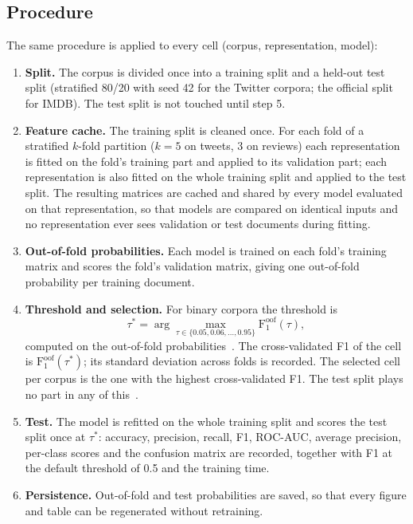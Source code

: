 \subsection{Procedure}
The same procedure is applied to every cell (corpus, representation, model):
\begin{enumerate}
\item \textbf{Split.} The corpus is divided once into a training split and a held-out test split (stratified 80/20 with seed 42 for the Twitter corpora; the official split for IMDB). The test split is not touched until step 5.
\item \textbf{Feature cache.} The training split is cleaned once. For each fold of a stratified $k$-fold partition ($k = 5$ on tweets, 3 on reviews) each representation is fitted on the fold's training part and applied to its validation part; each representation is also fitted on the whole training split and applied to the test split. The resulting matrices are cached and shared by every model evaluated on that representation, so that models are compared on identical inputs and no representation ever sees validation or test documents during fitting.
\item \textbf{Out-of-fold probabilities.} Each model is trained on each fold's training matrix and scores the fold's validation matrix, giving one out-of-fold probability per training document.
\item \textbf{Threshold and selection.} For binary corpora the threshold is
\begin{equation}
\tau^\ast = \arg\max_{\tau \in \{0.05, 0.06, \dots, 0.95\}} \mathrm{F}_1^{\mathrm{oof}}(\tau),
\end{equation}
computed on the out-of-fold probabilities~\cite{lipton2014}. The cross-validated F1 of the cell is $\mathrm{F}_1^{\mathrm{oof}}(\tau^\ast)$; its standard deviation across folds is recorded. The selected cell per corpus is the one with the highest cross-validated F1. The test split plays no part in any of this~\cite{cawley2010}.
\item \textbf{Test.} The model is refitted on the whole training split and scores the test split once at $\tau^\ast$: accuracy, precision, recall, F1, ROC-AUC, average precision, per-class scores and the confusion matrix are recorded, together with F1 at the default threshold of 0.5 and the training time.
\item \textbf{Persistence.} Out-of-fold and test probabilities are saved, so that every figure and table can be regenerated without retraining.
\end{enumerate}

